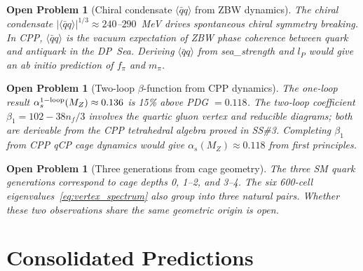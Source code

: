 \documentclass[11pt,a4paper]{article}
\newtheorem{openprob}[theorem]{Open Problem}
\newcommand{\lP}{l_P}
\newcommand{\as}{\alpha_s}
\newcommand{\qqbar}{\langle\bar{q}q\rangle}
\begin{document}
\begin{openprob}[Chiral condensate $\qqbar$ from ZBW dynamics]
\label{op:qqbar}
The chiral condensate $|\qqbar|^{1/3} \approx 240$--$290$~MeV
drives spontaneous chiral symmetry breaking.  In CPP, $\qqbar$ is
the vacuum expectation of ZBW phase coherence between quark and
antiquark in the DP~Sea.  Deriving $\qqbar$ from sea\_strength
and $\lP$ would give an ab initio prediction of $f_\pi$ and $m_\pi$.
\end{openprob}

\begin{openprob}[Two-loop $\beta$-function from CPP dynamics]
\label{op:alphas}
The one-loop result $\as^{\rm 1-loop}(M_Z) \approx 0.136$ is 15\%
above PDG $= 0.118$.  The two-loop coefficient $\beta_1 = 102 -
38n_f/3$ involves the quartic gluon vertex and reducible diagrams;
both are derivable from the CPP tetrahedral algebra proved in SS\#3.
Completing $\beta_1$ from CPP qCP cage dynamics would give
$\as(M_Z) \approx 0.118$ from first principles.
\end{openprob}

\begin{openprob}[Three generations from cage geometry]
\label{op:generations}
The three SM quark generations correspond to cage depths 0, 1--2,
and 3--4.  The six 600-cell eigenvalues~\eqref{eq:vertex_spectrum}
also group into three natural pairs.  Whether these two observations
share the same geometric origin is open.
\end{openprob}

\section{Consolidated Predictions}
\label{sec:predictions}
\end{document}
